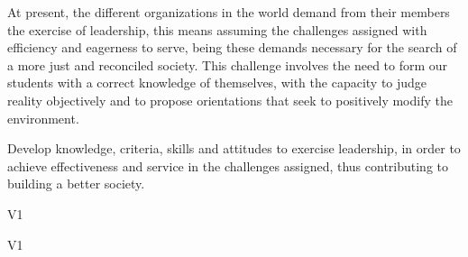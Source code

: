 \begin{syllabus}


\begin{justification}
	At present, the different organizations in the world demand from their members the exercise of leadership, this means assuming the challenges assigned with efficiency and eagerness to serve, being these demands necessary for the search of a more just and reconciled society. 
	This challenge involves the need to form our students with a correct knowledge of themselves, with the capacity to judge reality objectively and to propose orientations that seek to positively modify the environment.
\end{justification}

\begin{goals}
\item Develop knowledge, criteria, skills and attitudes to exercise leadership, in order to achieve effectiveness and service in the challenges assigned, thus contributing to building a better society.
\end{goals}

\begin{outcomes}{V1}
    \item {}
    \item {}
    \item {}
\end{outcomes}

\begin{competences}{V1}
    \item {}
    \item {}
    \item {}
\end{competences}


\end{syllabus}
